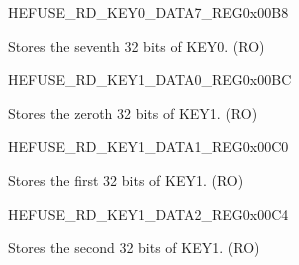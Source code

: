 \begin{register}{H}{EFUSE\_RD\_KEY0\_DATA7\_REG}{0x00B8}\label{regdesc:EFUSERDKEY0DATA7REG}
%
\regnewline%
\begin{regdesc}\begin{reglist}
\label{fielddesc:EFUSEKEY0DATA7}\item [EFUSE\_KEY0\_DATA7] Stores the seventh 32 bits of KEY0. (RO)
\end{reglist}\end{regdesc}
\end{register}


\begin{register}{H}{EFUSE\_RD\_KEY1\_DATA0\_REG}{0x00BC}\label{regdesc:EFUSERDKEY1DATA0REG}
%
\regnewline%
\begin{regdesc}\begin{reglist}
\label{fielddesc:EFUSEKEY1DATA0}\item [EFUSE\_KEY1\_DATA0] Stores the zeroth 32 bits of KEY1. (RO)
\end{reglist}\end{regdesc}
\end{register}


\begin{register}{H}{EFUSE\_RD\_KEY1\_DATA1\_REG}{0x00C0}\label{regdesc:EFUSERDKEY1DATA1REG}
%
\regnewline%
\begin{regdesc}\begin{reglist}
\label{fielddesc:EFUSEKEY1DATA1}\item [EFUSE\_KEY1\_DATA1] Stores the first 32 bits of KEY1. (RO)
\end{reglist}\end{regdesc}
\end{register}


\begin{register}{H}{EFUSE\_RD\_KEY1\_DATA2\_REG}{0x00C4}\label{regdesc:EFUSERDKEY1DATA2REG}
%
\regnewline%
\begin{regdesc}\begin{reglist}
\label{fielddesc:EFUSEKEY1DATA2}\item [EFUSE\_KEY1\_DATA2] Stores the second 32 bits of KEY1. (RO)
\end{reglist}\end{regdesc}
\end{register}


